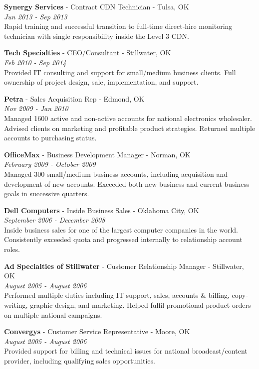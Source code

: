 \documentclass[10pt]{article} %
\begin{document}
{
\textbf{Synergy Services} - Contract CDN Technician - Tulsa, OK\\
\textit{Jun 2013 - Sep 2013}\\ 
Rapid training and successful transition to full-time direct-hire monitoring technician with single responsibility inside the Level 3 CDN.

\textbf{Tech Specialties} - CEO/Consultant - Stillwater, OK\\
\textit{Feb 2010 - Sep 2014}\\ 
Provided IT consulting and support for small/medium business clients. Full ownership of project design, sale, implementation, and support.

\textbf{Petra} - Sales Acquisition Rep - Edmond, OK\\
\textit{Nov 2009 - Jan 2010}\\ 
Managed 1600 active and non-active accounts for national electronics wholesaler. Advised clients on marketing and profitable product strategies. Returned multiple accounts to purchasing status.

\textbf{OfficeMax} - Business Development Manager - Norman, OK\\
\textit{February 2009 - October 2009}\\ 
Managed 300 small/medium business accounts, including acquisition and development of new accounts. Exceeded both new business and current business goals in successive quarters.

\textbf{Dell Computers} - Inside Business Sales - Oklahoma City, OK\\
\textit{September 2006 - December 2008}\\ 
Inside business sales for one of the largest computer companies in the world. Consistently exceeded quota and progressed internally to relationship account roles.

\textbf{Ad Specialties of Stillwater} - Customer Relationship Manager - Stillwater, OK\\
\textit{August 2005 - August 2006}\\
Performed multiple duties including IT support, sales, accounts \& billing, copy-writing, graphic design, and marketing. Helped fulfil promotional product orders on multiple national campaigns.

\textbf{Convergys} - Customer Service Representative - Moore, OK\\
\textit{August 2005 - August 2006}\\
Provided support for billing and technical issues for national broadcast/content provider, including qualifying sales opportunities.
}
\end{document}
